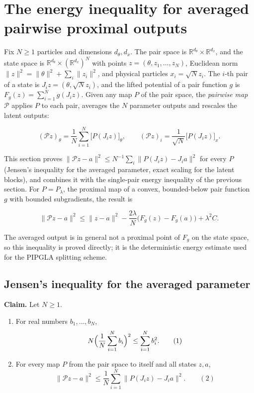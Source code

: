 \documentclass[11pt,a4paper]{report}
\begin{document}
\section{\texorpdfstring{The energy inequality for averaged pairwise proximal outputs}{The energy inequality for averaged pairwise proximal outputs}}
\label{proof-module-ProximalLangevin-ParticleEnergy-lean}


Fix \(N\ge1\) particles and dimensions \(d_\theta,d_x\). The pair space is \(\mathbb R^{d_\theta}\times\mathbb R^{d_x}\), and the state space is \(\mathbb R^{d_\theta}\times(\mathbb R^{d_x})^N\) with points \(z=(\theta,z_1,\dots,z_N)\), Euclidean norm \(\|z\|^2=\|\theta\|^2+\sum_i\|z_i\|^2\), and physical particles \(x_i=\sqrt N z_i\). The \(i\)-th pair of a state is \(J_iz=(\theta,\sqrt Nz_i)\), and the lifted potential of a pair function \(g\) is \(F_g(z)=\sum_{i=1}^Ng(J_iz)\). Given any map \(P\) of the pair space, the \emph{pairwise map} \(\mathcal P\) applies \(P\) to each pair, averages the \(N\) parameter outputs and rescales the latent outputs:


\[(\mathcal Pz)_\theta=\frac1N\sum_{i=1}^N\bigl[P(J_iz)\bigr]_\theta,\qquad(\mathcal Pz)_i=\frac{1}{\sqrt N}\bigl[P(J_iz)\bigr]_x .\]


This section proves \(\|\mathcal Pz-a\|^2\le N^{-1}\sum_i\|P(J_iz)-J_ia\|^2\) for every \(P\) (Jensen's inequality for the averaged parameter, exact scaling for the latent blocks), and combines it with the single-pair energy inequality of the previous section. For \(P=P_\lambda\), the proximal map of a convex, bounded-below pair function \(g\) with bounded subgradients, the result is


\[\|\mathcal Pz-a\|^2\le\|z-a\|^2-\frac{2\lambda}{N}\bigl(F_g(z)-F_g(a)\bigr)+\lambda^2C.\]


The averaged output is in general not a proximal point of \(F_g\) on the state space, so this inequality is proved directly; it is the deterministic energy estimate used for the PIPGLA splitting scheme.

\subsection{\texorpdfstring{Jensen's inequality for the averaged parameter}{Jensen's inequality for the averaged parameter}}
\label{report-step-ProximalLangevin-ParticleEnergy-lean-1}


\textbf{Claim.} Let \(N\ge1\).



\begin{enumerate}


\item For real numbers \(b_1,\dots,b_N\),
\[N\Bigl(\frac1N\sum_{i=1}^Nb_i\Bigr)^2\le\sum_{i=1}^Nb_i^2.\qquad(1)\]

\item For every map \(P\) from the pair space to itself and all states \(z,a\),
\[\|\mathcal Pz-a\|^2\le\frac1N\sum_{i=1}^N\bigl\|P(J_iz)-J_ia\bigr\|^2.\qquad(2)\]

\end{enumerate}
\end{document}

